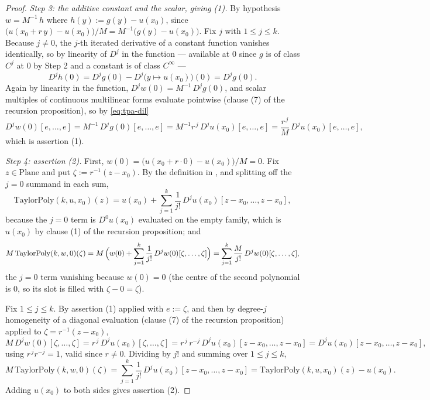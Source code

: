 \begin{proof}
\medskip\noindent\emph{Step 3: the additive constant and the scalar, giving (1).}
By hypothesis $w=M^{-1}\,h$ where $h(y):=g(y)-u(x_0)$, since
$\bigl(u(x_0+r\,y)-u(x_0)\bigr)/M=M^{-1}\bigl(g(y)-u(x_0)\bigr)$.  Fix $j$ with
$1\le j\le k$.  Because $j\ne0$, the $j$-th iterated derivative of a constant function
vanishes identically, so by linearity of $D^{j}$ in the function --- available at $0$ since
$g$ is of class $C^{j}$ at $0$ by Step 2 and a constant is of class $C^{\infty}$ ---
\[
  D^{j}h(0)=D^{j}g(0)-D^{j}\bigl(y\mapsto u(x_0)\bigr)(0)=D^{j}g(0).
\]
Again by linearity in the function, $D^{j}w(0)=M^{-1}\,D^{j}g(0)$, and scalar multiples of
continuous multilinear forms evaluate pointwise (clause (7) of the recursion proposition), so
by \eqref{eq:tpa-dil}
\[
  D^{j}w(0)[e,\ldots,e]=M^{-1}\,D^{j}g(0)[e,\ldots,e]
  =M^{-1}r^{\,j}\,D^{j}u(x_0)[e,\ldots,e]
  =\frac{r^{\,j}}{M}\,D^{j}u(x_0)[e,\ldots,e],
\]
which is assertion (1).

\medskip\noindent\emph{Step 4: assertion (2).}
First, $w(0)=\bigl(u(x_0+r\cdot0)-u(x_0)\bigr)/M=0$.  Fix $z\in\mathrm{Plane}$ and put
$\zeta:=r^{-1}(z-x_0)$.  By the definition in , and splitting off the
$j=0$ summand in each sum,
\[
  \mathrm{TaylorPoly}(k,u,x_0)(z)
  =u(x_0)+\sum_{j=1}^{k}\frac{1}{j!}\,D^{j}u(x_0)[z-x_0,\ldots,z-x_0],
\]
because the $j=0$ term is $D^{0}u(x_0)$ evaluated on the empty family, which is $u(x_0)$ by
clause (1) of the recursion proposition; and
\[
  M\,\mathrm{TaylorPoly}(k,w,0)(\zeta)
  =M\,\Bigl(w(0)+\sum_{j=1}^{k}\frac{1}{j!}\,D^{j}w(0)[\zeta,\ldots,\zeta]\Bigr)
  =\sum_{j=1}^{k}\frac{M}{j!}\,D^{j}w(0)[\zeta,\ldots,\zeta],
\]
the $j=0$ term vanishing because $w(0)=0$ (the centre of the second polynomial is $0$, so its
slot is filled with $\zeta-0=\zeta$).

Fix $1\le j\le k$.  By assertion (1) applied with $e:=\zeta$, and then by degree-$j$
homogeneity of a diagonal evaluation (clause (7) of the recursion proposition) applied to
$\zeta=r^{-1}(z-x_0)$,
\[
  M\,D^{j}w(0)[\zeta,\ldots,\zeta]
  =r^{\,j}\,D^{j}u(x_0)[\zeta,\ldots,\zeta]
  =r^{\,j}\,r^{-j}\,D^{j}u(x_0)[z-x_0,\ldots,z-x_0]
  =D^{j}u(x_0)[z-x_0,\ldots,z-x_0],
\]
using $r^{\,j}r^{-j}=1$, valid since $r\ne0$.  Dividing by $j!$ and summing over
$1\le j\le k$,
\[
  M\,\mathrm{TaylorPoly}(k,w,0)(\zeta)
  =\sum_{j=1}^{k}\frac{1}{j!}\,D^{j}u(x_0)[z-x_0,\ldots,z-x_0]
  =\mathrm{TaylorPoly}(k,u,x_0)(z)-u(x_0).
\]
Adding $u(x_0)$ to both sides gives assertion (2).
\end{proof}
